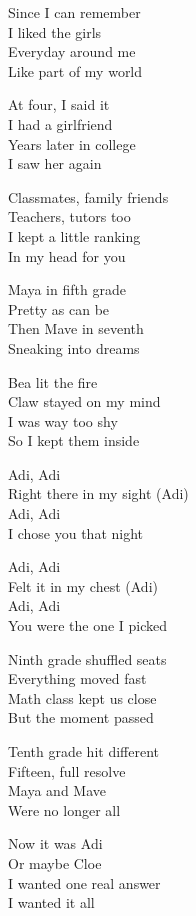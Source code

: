 \begin{lyrics}

Since I can remember\\
I liked the girls\\
Everyday around me\\
Like part of my world

At four, I said it\\
I had a girlfriend\\
Years later in college\\
I saw her again

Classmates, family friends\\
Teachers, tutors too\\
I kept a little ranking\\
In my head for you

Maya in fifth grade\\
Pretty as can be\\
Then Mave in seventh\\
Sneaking into dreams

Bea lit the fire\\
Claw stayed on my mind\\
I was way too shy\\
So I kept them inside

Adi, Adi\\
Right there in my sight (Adi)\\
Adi, Adi\\
I chose you that night

Adi, Adi\\
Felt it in my chest (Adi)\\
Adi, Adi\\
You were the one I picked

Ninth grade shuffled seats\\
Everything moved fast\\
Math class kept us close\\
But the moment passed

Tenth grade hit different\\
Fifteen, full resolve\\
Maya and Mave\\
Were no longer all

Now it was Adi\\
Or maybe Cloe\\
I wanted one real answer\\
I wanted it all


\end{lyrics}
